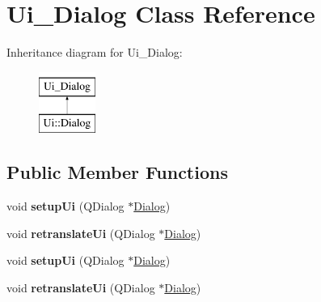 \hypertarget{classUi__Dialog}{}\section{Ui\+\_\+\+Dialog Class Reference}
\label{classUi__Dialog}
Inheritance diagram for Ui\+\_\+\+Dialog\+:\begin{figure}[H]
\begin{center}
\leavevmode
\includegraphics[height=2.000000cm]{classUi__Dialog}
\end{center}
\end{figure}
\subsection*{Public Member Functions}
\begin{DoxyCompactItemize}
\item 
\hypertarget{classUi__Dialog_a4f6a478c3ecdafabffb17b39cb26444a}{}void {\bfseries setup\+Ui} (Q\+Dialog $\ast$\hyperlink{classDialog}{Dialog})\label{classUi__Dialog_a4f6a478c3ecdafabffb17b39cb26444a}

\item 
\hypertarget{classUi__Dialog_afa0ccb6f716ca6178260522a193c250e}{}void {\bfseries retranslate\+Ui} (Q\+Dialog $\ast$\hyperlink{classDialog}{Dialog})\label{classUi__Dialog_afa0ccb6f716ca6178260522a193c250e}

\item 
\hypertarget{classUi__Dialog_a4f6a478c3ecdafabffb17b39cb26444a}{}void {\bfseries setup\+Ui} (Q\+Dialog $\ast$\hyperlink{classDialog}{Dialog})\label{classUi__Dialog_a4f6a478c3ecdafabffb17b39cb26444a}

\item 
\hypertarget{classUi__Dialog_afa0ccb6f716ca6178260522a193c250e}{}void {\bfseries retranslate\+Ui} (Q\+Dialog $\ast$\hyperlink{classDialog}{Dialog})\label{classUi__Dialog_afa0ccb6f716ca6178260522a193c250e}

\end{DoxyCompactItemize}
